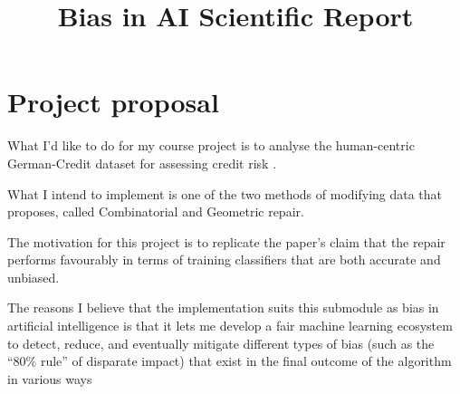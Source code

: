\documentclass[conference]{IEEEtran}
\begin{document}
\title{Bias in AI Scientific Report}

\author{
}

\maketitle

\begin{abstract}

\end{abstract}

\begin{IEEEkeywords}

\end{IEEEkeywords}

\section{Project proposal}

What I'd like to do for my course project is to analyse the human-centric German-Credit dataset for assessing credit risk \cite{}.

What I intend to implement is one of the two methods of modifying data that \cite{Feldman2015ComputationalFP} proposes, called Combinatorial
and Geometric repair. 

The motivation for this project is to replicate the paper's claim that the repair performs favourably in terms of training classifiers that are
both accurate and unbiased.

The reasons I believe that the implementation suits this submodule as bias in artificial intelligence is that it lets me develop a fair machine learning ecosystem
to detect, reduce, and eventually mitigate different types of bias (such as the “80\% rule” of disparate impact) that exist in the final outcome of the algorithm in various ways
\end{document}
